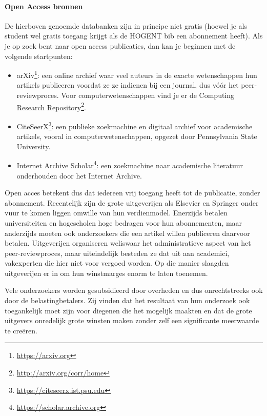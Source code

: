 \paragraph{Open Access bronnen}

De hierboven genoemde databanken zijn in principe niet gratis (hoewel je als student wel gratis toegang krijgt als de HOGENT bib een abonnement heeft). Als je op zoek bent naar open access publicaties, dan kan je beginnen met de volgende startpunten:

\begin{itemize}
  \item arXiv\footnote{\url{https://arxiv.org}}: een online archief waar veel auteurs in de exacte wetenschappen hun artikels publiceren voordat ze ze indienen bij een journal, dus vóór het peer-reviewproces. Voor computerwetenschappen vind je er de Computing Research Repository\footnote{\url{http://arxiv.org/corr/home}}.
  
  \item CiteSeerX\footnote{\url{https://citeseerx.ist.psu.edu}}: een publieke zoekmachine en digitaal archief voor academische artikels, vooral in computerwetenschappen, opgezet door Pennsylvania State University.

  \item Internet Archive Scholar\footnote{\url{https://scholar.archive.org}}: een zoekmachine naar academische literatuur onderhouden door het Internet Archive.
\end{itemize}

Open acces betekent dus dat iedereen vrij toegang heeft tot de publicatie, zonder abonnement. Recentelijk zijn de grote uitgeverijen als Elsevier en Springer onder vuur te komen liggen omwille van hun verdienmodel. Enerzijds betalen universiteiten en hogescholen hoge bedragen voor hun abonnementen, maar anderzijds moeten ook onderzoekers die een artikel willen publiceren daarvoor betalen. Uitgeverijen organiseren weliswaar het administratieve aspect van het peer-reviewproces, maar uiteindelijk besteden ze dat uit aan academici, vakexperten die hier niet voor vergoed worden. Op die manier slaagden uitgeverijen er in om hun winstmarges enorm te laten toenemen. 

Vele onderzoekers worden gesubsidieerd door overheden en dus onrechtstreeks ook door de belastingbetalers. Zij vinden dat het resultaat van hun onderzoek ook toegankelijk moet zijn voor diegenen die het mogelijk maakten en dat de grote uitgevers onredelijk grote winsten maken zonder zelf een significante meerwaarde te creëren.

